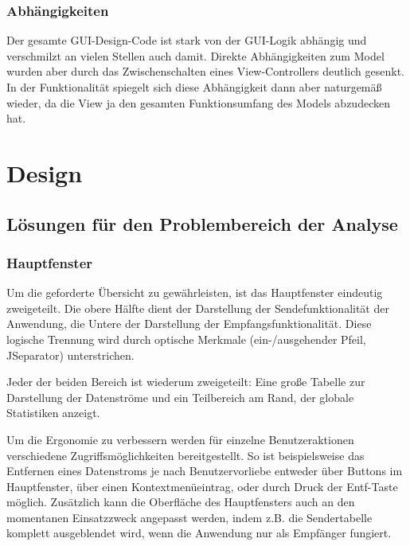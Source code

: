         
        \subsection{Abhängigkeiten}
            Der gesamte GUI-Design-Code ist stark von der GUI-Logik abhängig und
            verschmilzt an vielen Stellen auch damit. Direkte Abhängigkeiten zum
            Model wurden aber durch das Zwischenschalten eines View-Controllers
            deutlich gesenkt. In der Funktionalität spiegelt sich diese
            Abhängigkeit dann aber naturgemäß wieder, da die View ja den
            gesamten Funktionsumfang des Models abzudecken hat.
            
        
 


\chapter{Design}
        
    \section{Lösungen für den Problembereich der Analyse}
        
        \subsection{Hauptfenster}
        
            Um die geforderte Übersicht zu gewährleisten, ist das Hauptfenster
            eindeutig zweigeteilt. Die obere Hälfte dient der Darstellung der
            Sendefunktionalität der Anwendung, die Untere der Darstellung der
            Empfangsfunktionalität. Diese logische Trennung wird durch optische
            Merkmale (ein-/ausgehender Pfeil, JSeparator) unterstrichen.
            
            Jeder der beiden Bereich ist wiederum zweigeteilt: Eine große
            Tabelle zur Darstellung der Datenströme und ein Teilbereich am Rand,
            der globale Statistiken anzeigt.
            
            Um die Ergonomie zu verbessern werden für einzelne Benutzeraktionen
            verschiedene Zugriffsmöglichkeiten bereitgestellt. So ist
            beispielsweise das Entfernen eines Datenstroms je nach
            Benutzervorliebe entweder über Buttons im Hauptfenster, über einen
            Kontextmenüeintrag, oder durch Druck der Entf-Taste möglich.
            Zusätzlich kann die Oberfläche des Hauptfensters auch an den
            momentanen Einsatzzweck angepasst werden, indem z.B. die
            Sendertabelle komplett ausgeblendet wird, wenn die Anwendung nur als
            Empfänger fungiert.
            
